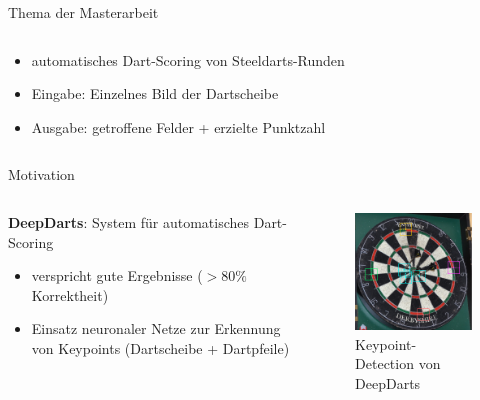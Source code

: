 \begin{frame}{Thema der Masterarbeit}
\begin{columns}
\begin{column}{0.6\linewidth}
            \begin{itemize}
                \item automatisches Dart-Scoring von Steeldarts-Runden
                \item Eingabe: Einzelnes Bild der Dartscheibe
                \item Ausgabe: getroffene Felder + erzielte Punktzahl
            \end{itemize}

        \end{column}
    \end{columns}
\end{frame}

\begin{frame}{Motivation}

    \begin{columns}
        \begin{column}{0.6\linewidth}

            \textbf{DeepDarts}: System für automatisches Dart-Scoring
            \begin{itemize}
                \item verspricht gute Ergebnisse ($>80\%$ Korrektheit)
                \item Einsatz neuronaler Netze zur Erkennung von Keypoints (Dartscheibe + Dartpfeile)
            \end{itemize}

        \end{column}
        \begin{column}{0.4\linewidth}

            \begin{figure}
                \centering
                \includegraphics[width=0.8\linewidth]{imgs/dd_keypoints.pdf}
                \vspace*{-0.2cm}
                \caption{Keypoint-Detection von DeepDarts}
            \end{figure}


\end{column}
\end{columns}
\end{frame}
